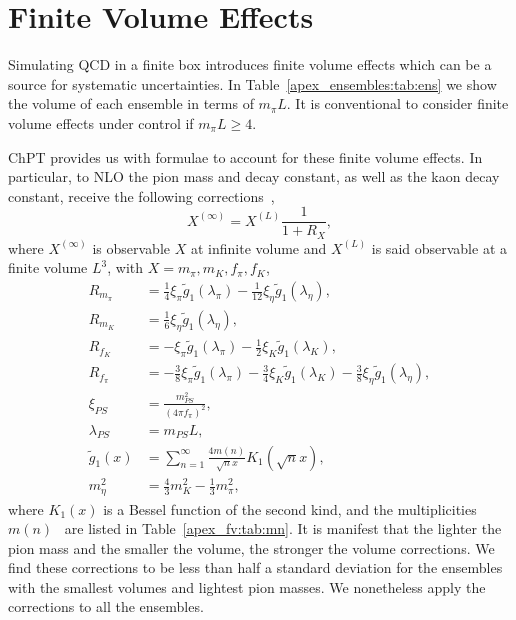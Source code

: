 
\chapter{Finite Volume Effects}
\label{apex_fv}

Simulating QCD in a finite box introduces finite volume effects which can be a source for systematic uncertainties. In Table~\ref{apex_ensembles:tab:ens} we show the volume of each ensemble in terms of $m_{\pi}L$. It is conventional to consider finite volume effects under control if $m_{\pi}L\geq4$.

ChPT provides us with formulae to account for these finite volume effects. In particular, to NLO the pion mass and decay constant, as well as the kaon decay constant, receive the following corrections~\citep{Colangelo:2003hf},\citep{Colangelo:2005gd}
\begin{equation}
X^{(\infty)}=X^{(L)}\frac{1}{1+R_X},
\end{equation}
where $X^{(\infty)}$ is observable $X$ at infinite volume and $X^{(L)}$ is said observable at a finite volume $L^3$, with $X=m_{\pi},m_K,f_{\pi},f_K$,
\begin{align}
R_{m_{\pi}}&=\frac{1}{4}\xi_{\pi}\tilde{g}_1(\lambda_{\pi})-\frac{1}{12}\xi_{\eta}\tilde{g}_1(\lambda_{\eta}), \\
R_{m_K}&=\frac{1}{6}\xi_{\eta}\tilde{g}_1(\lambda_{\eta}), \\
R_{f_K}&=-\xi_{\pi}\tilde{g}_1(\lambda_{\pi})-\frac{1}{2}\xi_{K}\tilde{g}_1(\lambda_{K}), \\
R_{f_{\pi}}&=-\frac{3}{8}\xi_{\pi}\tilde{g}_1(\lambda_{\pi})-\frac{3}{4}\xi_{K}\tilde{g}_1(\lambda_{K})-\frac{3}{8}\xi_{\eta}\tilde{g}_1(\lambda_{\eta}), \\
\xi_{PS}&=\frac{m_{PS}^2}{(4\pi f_{\pi})^2}, \\
\lambda_{PS}&=m_{PS}L, \\
\tilde{g}_1(x)&=\sum_{n=1}^{\infty}\frac{4m(n)}{\sqrt{n}x}K_1(\sqrt{n}x), \\
m_{\eta}^2&=\frac{4}{3}m_K^2-\frac{1}{3}m_{\pi}^2,
\end{align}
where $K_1(x)$ is a Bessel function of the second kind, and the multiplicities $m(n)$~\citep{Colangelo:2003hf} are listed in Table~\ref{apex_fv:tab:mn}. It is manifest that the lighter the pion mass and the smaller the volume, the stronger the volume corrections. We find these corrections to be less than half a standard deviation for the ensembles with the smallest volumes and lightest pion masses. We nonetheless apply the corrections to all the ensembles.

